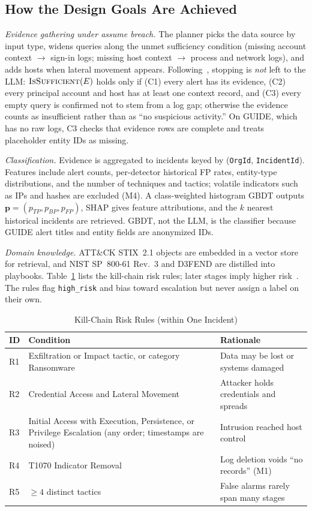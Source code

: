\documentclass[conference]{IEEEtran}
\begin{document}
\subsection{How the Design Goals Are Achieved}
\emph{Evidence gathering under assume breach.} The planner picks the
data source by input type, widens queries along the unmet sufficiency
condition (missing account context $\rightarrow$ sign-in logs; missing
host context $\rightarrow$ process and network logs), and adds hosts
when lateral movement appears. Following~\cite{tsegai2026}, stopping is
\emph{not} left to the LLM: $\textsc{IsSufficient}(E)$ holds only if
(C1) every alert has its evidence, (C2) every principal account and
host has at least one context record, and (C3) every empty query is
confirmed not to stem from a log gap; otherwise the evidence counts as
insufficient rather than as ``no suspicious activity.'' On GUIDE, which
has no raw logs, C3 checks that evidence rows are complete and treats
placeholder entity IDs as missing.

\emph{Classification.} Evidence is aggregated to incidents keyed by
(\texttt{OrgId}, \texttt{IncidentId}). Features include alert counts,
per-detector historical FP rates, entity-type distributions, and the
number of techniques and tactics; volatile indicators such as IPs and
hashes are excluded (M4). A class-weighted histogram GBDT
outputs $\mathbf{p}=(p_{TP},p_{BP},p_{FP})$, SHAP gives feature
attributions, and the $k$ nearest historical incidents are retrieved.
GBDT, not the LLM, is the classifier because GUIDE alert titles and
entity fields are anonymized IDs.

\emph{Domain knowledge.} ATT\&CK STIX~2.1 objects are embedded in a
vector store for retrieval, and NIST SP~800-61 Rev.~3 and D3FEND are
distilled into playbooks. Table~\ref{tab:rules} lists the kill-chain
risk rules; later stages imply higher risk~\cite{sadlek2025,garcia2025rosca}.
The rules flag \texttt{high\_risk} and bias toward escalation but never
assign a label on their own.

\begin{table}[t]
\caption{Kill-Chain Risk Rules (within One Incident)}
\label{tab:rules}
\centering
\footnotesize
\setlength{\tabcolsep}{3pt}
\begin{tabular}{@{}p{0.5cm}p{3.7cm}p{3.5cm}@{}}
\toprule
\textbf{ID} & \textbf{Condition} & \textbf{Rationale} \\
\midrule
R1 & Exfiltration or Impact tactic, or category Ransomware
   & Data may be lost or systems damaged \\
R2 & Credential Access and Lateral Movement
   & Attacker holds credentials and spreads \\
R3 & Initial Access with Execution, Persistence, or Privilege
     Escalation (any order; timestamps are noised)
   & Intrusion reached host control \\
R4 & T1070 Indicator Removal
   & Log deletion voids ``no records'' (M1) \\
R5 & $\geq 4$ distinct tactics
   & False alarms rarely span many stages \\
\bottomrule
\end{tabular}
\end{table}
\end{document}
